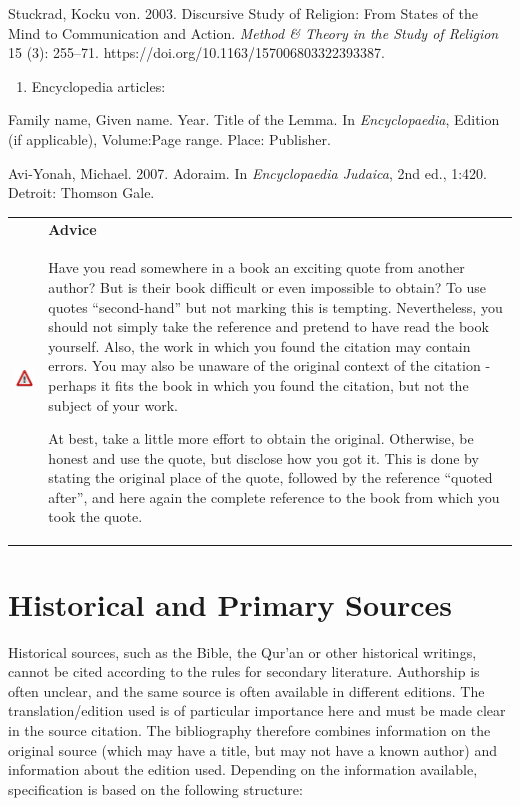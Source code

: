 \documentclass[
  english,
]{scrreprt}
\providecommand{\tightlist}{%
  \setlength{\itemsep}{0pt}\setlength{\parskip}{0pt}}
\newlength{\iconwidth}
\newenvironment{displaybox}[2]{%
    \begin{center}
        \setlength\arrayrulewidth{0.75pt}%
        \arrayrulecolor{white}%
        \renewcommand{\arraystretch}{1.3}%
        \begin{tabular}{p{\iconwidth}p{\linewidth-4\tabcolsep-\iconwidth}}
            \multirow{2}{*}{#2}&\cellcolor{boxheadcol}\textbf{\sffamily\color{white}#1} \\%
            \hhline{~-}%
            &\cellcolor{boxcol}%
}{%
            \\
        \end{tabular}
        \arrayrulecolor{black}
    \end{center}
}
\newenvironment{Advice}{%
\begin{displaybox}{Advice}{\includegraphics[width=\iconwidth]{images/icon-hinweis}}}%
{\end{displaybox}}
\begin{document}
Stuckrad, Kocku von. 2003. Discursive Study of Religion: From States of the Mind to Communication and Action. \emph{Method \& Theory in the Study of Religion} 15 (3): 255–71. https://doi.org/10.1163/157006803322393387.

\begin{enumerate}
\def\labelenumi{\alph{enumi})}
\setcounter{enumi}{3}
\tightlist
\item
  Encyclopedia articles:
\end{enumerate}

Family name, Given name. Year. Title of the Lemma. In \emph{Encyclopaedia}, Edition (if applicable), Volume:Page range. Place: Publisher.

Avi-Yonah, Michael. 2007. Adoraim. In \emph{Encyclopaedia Judaica}, 2nd ed., 1:420. Detroit: Thomson Gale.

\begin{Advice}

Have you read somewhere in a book an exciting quote from another author? But is their book difficult or even impossible to obtain? To use quotes “second-hand” but not marking this is tempting. Nevertheless, you should not simply take the reference and pretend to have read the book yourself. Also, the work in which you found the citation may contain errors. You may also be unaware of the original context of the citation - perhaps it fits the book in which you found the citation, but not the subject of your work.

At best, take a little more effort to obtain the original. Otherwise, be honest and use the quote, but disclose how you got it. This is done by stating the original place of the quote, followed by the reference “quoted after”, and here again the complete reference to the book from which you took the quote.

\end{Advice}

\section{Historical and Primary Sources}\label{historical-and-primary-sources}

Historical sources, such as the Bible, the Qur’an or other historical writings, cannot be cited according to the rules for secondary literature. Authorship is often unclear, and the same source is often available in different editions. The translation/edition used is of particular importance here and must be made clear in the source citation. The bibliography therefore combines information on the original source (which may have a title, but may not have a known author) and information about the edition used. Depending on the information available, specification is based on the following structure:
\end{document}
